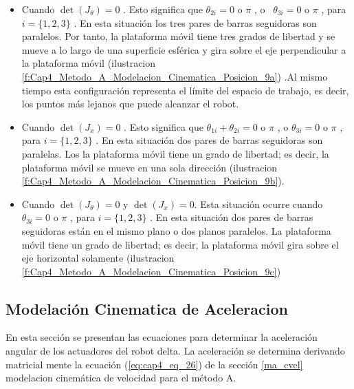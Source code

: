         \begin{itemize}
	        \item {\fontsize{10pt}{12.0pt}\selectfont Cuando  $\det  \left( J_{ \theta } \right) =0$ . Esto significa que  $\theta _{2i}=0$  o  $\pi$ , o \   $\theta _{3i}=0$ o  $\pi$  , para  \( i = \{ 1,2 ,3 \}  \) . En esta situación los tres pares de barras seguidoras son paralelos. Por tanto, la plataforma móvil tiene tres grados de libertad y se mueve a lo largo de una superficie esférica y gira sobre el eje perpendicular a la plataforma móvil (ilustracion \ref{f:Cap4_Metodo_A_Modelacion_Cinematica_Posicion_9a}) .Al mismo tiempo esta configuración representa el límite del espacio de trabajo, es decir, los puntos más lejanos que puede alcanzar el robot. }

	        \item {\fontsize{10pt}{12.0pt}\selectfont Cuando  $\det  \left( J_{x} \right) =0 $ . Esto significa que    $ \theta _{1i}+  \theta _{2i}=0$  o  $\pi$ , o $\theta _{3i}=0$  o  $ \pi $   , para  \( i = \{ 1,2 ,3 \}  \) . En esta situación dos pares de barras seguidoras son paralelas. Los la plataforma móvil tiene un grado de libertad; es decir, la plataforma móvil se mueve en una sola dirección (ilustracion \ref{f:Cap4_Metodo_A_Modelacion_Cinematica_Posicion_9b}).}

	        \item {\fontsize{10pt}{12.0pt}\selectfont Cuando $ \det  \left( J_{ \theta } \right) =0 $  y $ \det  \left( J_{x} \right) =0 $. Esta situación ocurre cuando  $  \theta _{3i}=0$ o  $ \pi  $  , para  \( i = \{ 1,2 ,3 \}  \) . En esta situación dos pares de barras seguidoras están en el mismo plano o dos planos paralelos. La plataforma móvil tiene un grado de libertad; es decir, la plataforma móvil gira sobre el eje horizontal solamente (ilustracion \ref{f:Cap4_Metodo_A_Modelacion_Cinematica_Posicion_9c})}
\end{itemize}

    
    \newpage
    
    \subsection{Modelación Cinematica de Aceleracion}

    En esta sección se presentan las ecuaciones para determinar la aceleración angular de los actuadores del robot delta. La aceleración se determina derivando matricial mente la ecuación (\ref{eq:cap4_eq_26}) de la sección \ref{ma_cvel} modelacion cinemática de velocidad para el método A.

